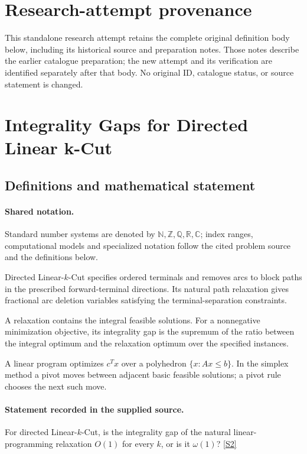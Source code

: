 \documentclass[11pt]{article}
\begin{document}
\section*{Research-attempt provenance}
This standalone research attempt retains the complete original definition body below,
including its historical source and preparation notes. Those notes describe the
earlier catalogue preparation; the new attempt and its verification are identified
separately after that body. No original ID, catalogue status, or source statement is changed.

\section{Integrality Gaps for Directed Linear k-Cut}\label{statement}

\subsection{Definitions and mathematical statement}

\paragraph{Shared notation.}Standard number systems are denoted by $\mathbb N,\mathbb Z,\mathbb Q,\mathbb R,\mathbb C$; index ranges, computational models and specialized notation follow the cited problem source and the definitions below.


Directed Linear-$k$-Cut specifies ordered terminals and removes arcs to block paths in the prescribed forward-terminal directions. Its natural path relaxation gives fractional arc deletion variables satisfying the terminal-separation constraints.

A relaxation contains the integral feasible solutions. For a nonnegative minimization objective, its integrality gap is the supremum of the ratio between the integral optimum and the relaxation optimum over the specified instances.

A linear program optimizes $c^Tx$ over a polyhedron $\{x:Ax\leq b\}$. In the simplex method a pivot moves between adjacent basic feasible solutions; a pivot rule chooses the next such move.
\paragraph{Statement recorded in the supplied source.}
For directed Linear-$k$-Cut, is the integrality gap of the natural linear-programming relaxation $O(1)$ for every $k$, or is it $\omega(1)$? \href{https://doi.org/10.4171/owr/2018/50}{[S2]}
\end{document}
